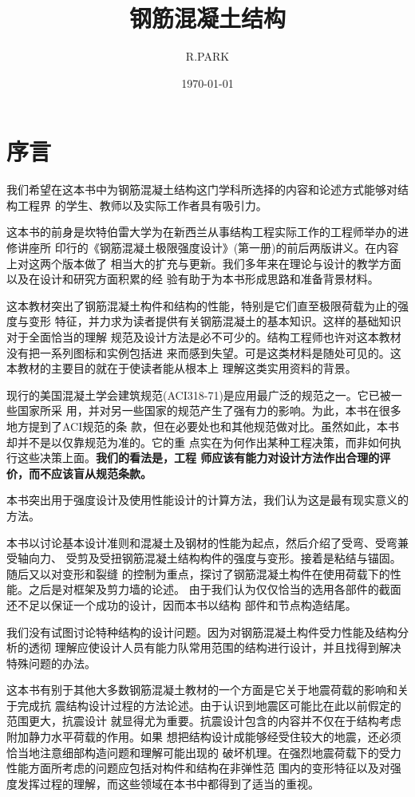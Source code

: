 \documentclass[12pt,a4paper]{book}
\title{}
\author{R.PARK}
\date{\today}
\title{钢筋混凝土结构}
\begin{document}
\maketitle

\chapter*{序言}

我们希望在这本书中为钢筋混凝土结构这门学科所选择的内容和论述方式能够对结构工程界
的学生、教师以及实际工作者具有吸引力。

这本书的前身是坎特伯雷大学为在新西兰从事结构工程实际工作的工程师举办的进修讲座所
印行的《钢筋混凝土极限强度设计》(第一册)的前后两版讲义。在内容上对这两个版本做了
相当大的扩充与更新。我们多年来在理论与设计的教学方面以及在设计和研究方面积累的经
验有助于为本书形成思路和准备背景材料。

这本教材突出了钢筋混凝土构件和结构的性能，特别是它们直至极限荷载为止的强度与变形
特征，并力求为读者提供有关钢筋混凝土的基本知识。这样的基础知识对于全面恰当的理解
规范及设计方法是必不可少的。结构工程师也许对这本教材没有把一系列图标和实例包括进
来而感到失望。可是这类材料是随处可见的。这本教材的主要目的就在于使读者能从根本上
理解这类实用资料的背景。

现行的美国混凝土学会建筑规范(ACI318-71)是应用最广泛的规范之一。它已被一些国家所采
用，并对另一些国家的规范产生了强有力的影响。为此，本书在很多地方提到了ACI规范的条
款，但在必要处也和其他规范做对比。虽然如此，本书却并不是以仅靠规范为准的。它的重
点实在为何作出某种工程决策，而非如何执行这些决策上面。\textbf{我们的看法是，工程
  师应该有能力对设计方法作出合理的评价，而不应该盲从规范条款。}

本书突出用于强度设计及使用性能设计的计算方法，我们认为这是最有现实意义的方法。

本书以讨论基本设计准则和混凝土及钢材的性能为起点，然后介绍了受弯、受弯兼受轴向力、
受剪及受扭钢筋混凝土结构构件的强度与变形。接着是粘结与锚固。随后又以对变形和裂缝
的控制为重点，探讨了钢筋混凝土构件在使用荷载下的性能。之后是对框架及剪力墙的论述。
由于我们认为仅仅恰当的选用各部件的截面还不足以保证一个成功的设计，因而本书以结构
部件和节点构造结尾。

我们没有试图讨论特种结构的设计问题。因为对钢筋混凝土构件受力性能及结构分析的透彻
理解应使设计人员有能力队常用范围的结构进行设计，并且找得到解决特殊问题的办法。

这本书有别于其他大多数钢筋混凝土教材的一个方面是它关于地震荷载的影响和关于完成抗
震结构设计过程的方法论述。由于认识到地震区可能比在此以前假定的范围更大，抗震设计
就显得尤为重要。抗震设计包含的内容并不仅在于结构考虑附加静力水平荷载的作用。如果
想把结构设计成能够经受住较大的地震，还必须恰当地注意细部构造问题和理解可能出现的
破坏机理。在强烈地震荷载下的受力性能方面所考虑的问题应包括对构件和结构在非弹性范
围内的变形特征以及对强度发挥过程的理解，而这些领域在本书中都得到了适当的重视。
\end{document}
